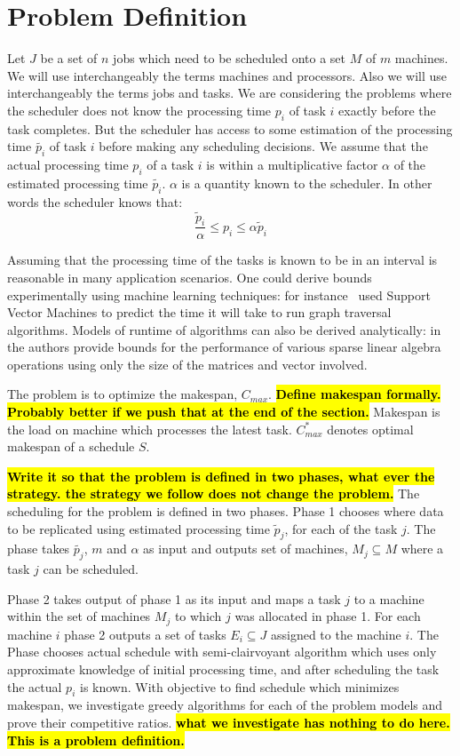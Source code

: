 \documentclass[10pt, conference, compsocconf]{IEEEtran}
\newcommand{\todo}[1]{{\color{red}\textbf{\hl{#1}}\xspace}}
\begin{document}
\section{Problem Definition}\label{sec2}
Let $J$ be a set of $n$ jobs which need to be scheduled onto a set $M$
of $m$ machines. We will use interchangeably the terms machines and
processors. Also we will use interchangeably the terms jobs and
tasks. We are considering the problems where the scheduler does not
know the processing time $p_i$ of task $i$ exactly before the task
completes.  But the scheduler has access to some estimation of the
processing time $\tilde{p_i}$ of task $i$ before making any scheduling
decisions. We assume that the actual processing time $p_i$ of a task
$i$ is within a multiplicative factor $\alpha$ of the estimated
processing time $\tilde{p_i}$. $\alpha$ is a quantity known to the
scheduler. In other words the scheduler knows that:
 \begin{equation}\label{eq1}
\frac{\tilde{p}_{i}}{\alpha}\leq p_{i}\leq \alpha \tilde{p}_{i}
\end{equation}


Assuming that the processing time of the tasks is known to be in an
interval is reasonable in many application scenarios. One could derive
bounds experimentally using machine learning techniques: for
instance~\cite{You14-ICPP} used Support Vector Machines to predict the time it
will take to run graph traversal algorithms. Models of runtime of
algorithms can also be derived analytically:
in~\cite{Erlebacher14-ICS} the authors provide bounds for the
performance of various sparse linear algebra operations using only the
size of the matrices and vector involved.

The problem is to optimize the makespan, $C_{max}$. \todo{Define
  makespan formally. Probably better if we push that at the end of the
  section.} Makespan is the load on machine which processes the latest task. $C_{max}^{*}$ denotes optimal makespan of a schedule $S$.

\todo{Write it so that the problem is defined in two phases, what ever
  the strategy. the strategy we follow does not change the problem.}
The scheduling for the problem is defined in two phases.  Phase 1 chooses where data to be replicated using estimated processing time $\tilde p_j $, for each of the task $j$. The phase takes $\tilde{p_j}$, $m$ and $\alpha$ as input and outputs set of machines, $M_j \subseteq M $ where a task $j$ can be scheduled.

Phase 2 takes output of phase 1 as its input and maps a task $j$ to a machine within the set of machines $M_j$ to which $j$ was allocated in phase 1.  For each  machine $i$ phase 2 outputs a set of tasks $E_i \subseteq J$ assigned to the machine $i$.  The Phase chooses actual schedule with semi-clairvoyant algorithm which uses only approximate knowledge of initial processing time, and after scheduling the task the actual $p_i$ is known.  With objective to find schedule which minimizes
makespan, we investigate greedy algorithms for each of the problem
models and prove their competitive ratios. \todo{what we investigate
has nothing to do here. This is a problem definition.}
\end{document}

